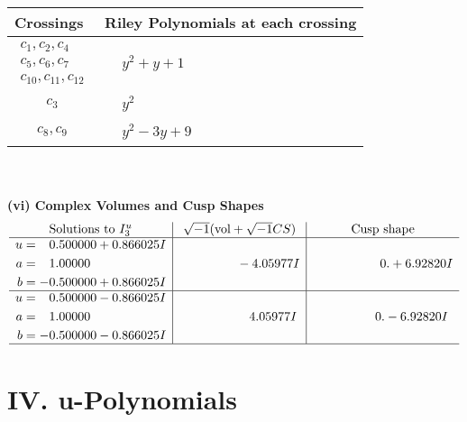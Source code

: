 \documentclass[1p]{elsarticle_modified}
\theoremstyle{definition}
\newcommand{\I}{\sqrt{-1}}
\begin{document}
\begin{tabular}{m{50pt}|m{274pt}}
Crossings & \hspace{64pt}Riley Polynomials at each crossing \\
\hline $$\begin{aligned}c_{1},c_{2},c_{4}\\c_{5},c_{6},c_{7}\\c_{10},c_{11},c_{12}\end{aligned}$$&$\begin{aligned}
&y^2+y+1
\end{aligned}$\\
\hline $$\begin{aligned}c_{3}\end{aligned}$$&$\begin{aligned}
&y^2
\end{aligned}$\\
\hline $$\begin{aligned}c_{8},c_{9}\end{aligned}$$&$\begin{aligned}
&y^2-3 y+9
\end{aligned}$\\
\hline
\end{tabular}\\~\\
\newpage\flushleft \textbf{(vi) Complex Volumes and Cusp Shapes}
$$\begin{array}{c|c|c}  
\text{Solutions to }I^u_{3}& \I (\text{vol} + \sqrt{-1}CS) & \text{Cusp shape}\\
 \hline 
\begin{aligned}
u &= \phantom{-}0.500000 + 0.866025 I \\
a &= \phantom{-}1.00000\phantom{ +0.000000I} \\
b &= -0.500000 + 0.866025 I\end{aligned}
 & \phantom{-0.000000 } -4.05977 I & \phantom{-0.000000 -}0. + 6.92820 I \\ \hline\begin{aligned}
u &= \phantom{-}0.500000 - 0.866025 I \\
a &= \phantom{-}1.00000\phantom{ +0.000000I} \\
b &= -0.500000 - 0.866025 I\end{aligned}
 & \phantom{-0.000000 -}4.05977 I & \phantom{-0.000000 } 0. - 6.92820 I\\
 \hline 
 \end{array}$$\newpage
\newpage\renewcommand{\arraystretch}{1}
\centering \section*{ IV. u-Polynomials}
\end{document}
